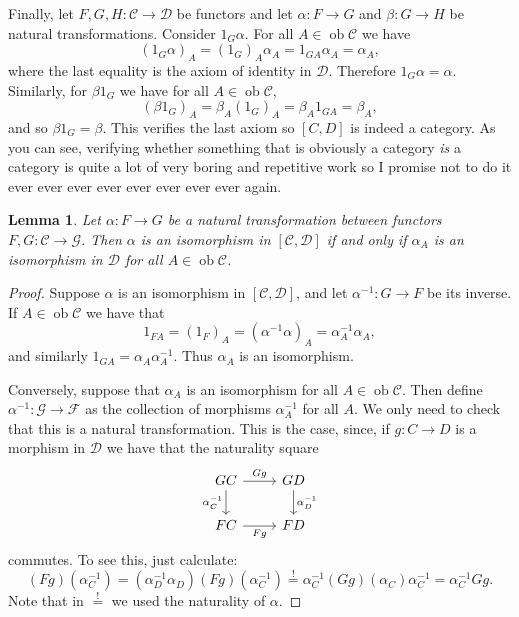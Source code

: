 \documentclass{report}
\DeclareMathOperator{\ob}{ob}
\theoremstyle{definition}
\theoremstyle{plain}
\newtheorem{lem}[thm]{Lemma}
\theoremstyle{definition}
\begin{document}
	Finally, let $F,G,H\colon\mathcal{C}\to \mathcal{D}$ be functors and let $\alpha \colon F \to G$ and $\beta\colon G \to H$ be natural transformations. Consider $1_G\alpha$. For all $A\in\ob \mathcal{C}$ we have 
	\[
		(1_G\alpha)_A = (1_G)_A\alpha_A = 1_{GA}\alpha_A = \alpha_A,
	\]
	where the last equality is the axiom of identity in $\mathcal{D}$. Therefore $1_G\alpha = \alpha$. Similarly, for $\beta1_G$ we have for all $A\in\ob \mathcal{C}$,
	\[
		(\beta1_G)_A = \beta_A(1_G)_A = \beta_A1_{GA} = \beta_A,
	\]		
	and so $\beta1_G = \beta$. This verifies the last axiom so $[C,D]$ is indeed a category. As you can see, verifying whether something that is obviously a category \emph{is} a category is quite a lot of very boring and repetitive work so I promise not to do it ever ever ever ever ever ever ever ever again.
	\begin{lem}\label{lem:nat_iso_pointw}
		Let $\alpha\colon F \to G$ be a natural transformation between functors $F,G\colon \mathcal{C}\to\mathcal{G}$. Then $\alpha$ is an isomorphism in $[\mathcal{C}, \mathcal{D}]$ if and only if $\alpha_A$ is an isomorphism in $\mathcal{D}$ for all $A\in\ob\mathcal{C}$.
	\end{lem}
	\begin{proof}
		Suppose $\alpha$ is an isomorphism in $[\mathcal{C}, \mathcal{D}]$, and let $\alpha^{-1}\colon G \to F$ be its inverse. If $A\in\ob \mathcal{C}$ we have that
		\[
			1_{FA} = (1_F)_A = (\alpha^{-1}\alpha)_A = \alpha^{-1}_A\alpha_A,
		\]
		and similarly $1_{GA} = \alpha_A\alpha^{-1}_A$. Thus $\alpha_A$ is an isomorphism.
		
		Conversely, suppose that $\alpha_A$ is an isomorphism for all $A\in\ob\mathcal{C}$. Then define $\alpha^{-1}\colon \mathcal{G} \to \mathcal{F}$ as the collection of morphisms $\alpha^{-1}_A$ for all $A$. We only need to check that this is a natural transformation. This is the case, since, if $g\colon C \to D$ is a morphism in $\mathcal{D}$ we have that the naturality square
		\[\begin{tikzcd}
			GC & GD \\
			FC & FD
			\arrow["Gg", from=1-1, to=1-2]
			\arrow["Fg"', from=2-1, to=2-2]
			\arrow["{\alpha^{-1}_C}"', from=1-1, to=2-1]
			\arrow["{\alpha^{-1}_D}", from=1-2, to=2-2]
		\end{tikzcd}\]
		commutes. To see this, just calculate:
		\[
			(Fg)(\alpha_C^{-1}) = (\alpha^{-1}_D\alpha_D)(Fg)(\alpha_C^{-1}) \overset{!}{=} \alpha^{-1}_C(Gg)(\alpha_C)\alpha_{C}^{-1} = \alpha_C^{-1}Gg.
		\]
		 Note that in $\overset{!}{=}$ we used the naturality of $\alpha$.
	\end{proof}
\end{document}
